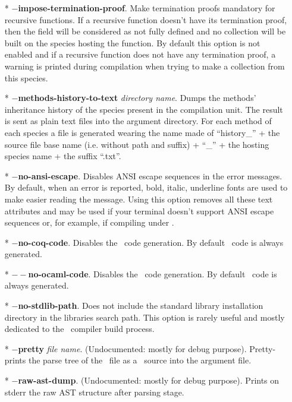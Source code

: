 \begin{itemize}
  \item[*] {\bf $-$impose-termination-proof}. Make termination proofs
    mandatory for recursive functions. If a recursive function doesn't
    have its termination proof, then the field will be considered as
    not fully defined and no collection will be built on the
    species hosting the function. By default this option is not
    enabled and if a recursive function does not have any termination
    proof, a warning is printed during compilation when trying to make
    a collection from this species.

 \item[*] {\bf $-$methods-history-to-text} {\em directory
   name}. Dumps the methods' inheritance history of the species
   present in the compilation unit. The result is sent as plain text files
   into the argument directory. For each method of each species a file
   is generated wearing the name made of ``history\_'' + the source
   file base name (i.e. without path and suffix) + ``\_'' + the
   hosting species name + the suffix ``.txt''.

  \item[*] {\bf $-$no-ansi-escape}. Disables ANSI escape sequences in
    the error messages. By default, when an error is reported, bold,
    italic, underline fonts are used to make easier reading the
    message. Using this option removes all these text attributes and
    may be used if your terminal doesn't support ANSI escape sequences
    or, for example, if compiling under \emacs.

  \item[*] {\bf $-$no-coq-code}. Disables the \coq\ code
    generation. By default \coq\ code is always generated.

  \item[*] {\bf $--$no-ocaml-code}. Disables the \ocaml\ code
    generation. By default \ocaml\ code is always generated.

   \item[*] {\bf $-$no-stdlib-path}. Does not include the standard
    library installation directory in the libraries search path. This
    option is rarely useful and mostly dedicated to the
    \focal\ compiler build process.

  \item[*] {\bf $-$pretty} {\em file name}. (Undocumented: mostly for
    debug purpose). Pretty-prints the parse tree of the \focal\ file
    as a \focal\ source into the argument file.

  \item[*] {\bf $-$raw-ast-dump}. (Undocumented: mostly for debug
    purpose). Prints on stderr the raw AST structure after parsing
    stage.


\end{itemize}
